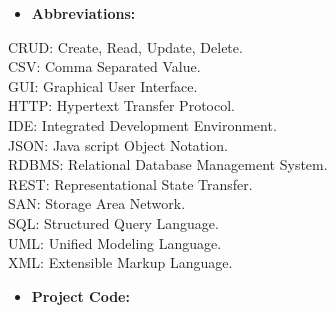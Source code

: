 \begin{itemize}
  \item \textbf{Abbreviations:}
\end{itemize}

CRUD: Create, Read, Update, Delete.\\
CSV: Comma Separated Value.\\
GUI: Graphical User Interface.\\
HTTP: Hypertext Transfer Protocol.\\
IDE: Integrated Development Environment.\\
JSON: Java script Object Notation.\\
RDBMS: Relational Database Management System.\\
REST: Representational State Transfer.\\
SAN: Storage Area Network.\\
SQL: Structured Query Language.\\
UML: Unified Modeling Language.\\
XML: Extensible Markup Language.\\

\newpage
\begin{itemize}
  \item \textbf{Project Code:}
\end{itemize}